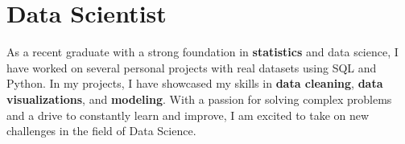 
\section{Data Scientist}
\small{
    As a recent graduate with a strong foundation in \textbf{statistics} and data science, I have worked on several personal projects with real datasets using SQL and Python. In my projects, I have showcased my skills in \textbf{data cleaning}, \textbf{data visualizations}, and \textbf{modeling}. With a passion for solving complex problems and a drive to constantly learn and improve, I am excited to take on new challenges in the field of Data Science.
}